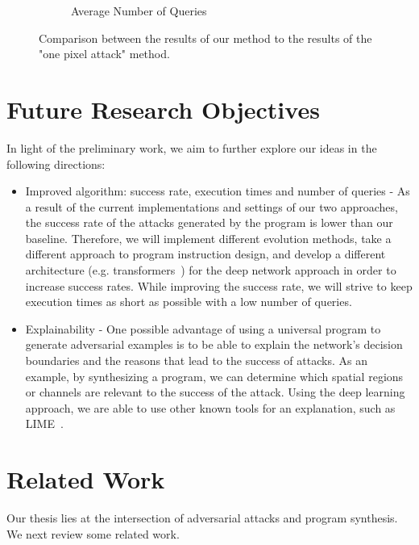 \documentclass[11pt]{article}
\begin{document}
\begin{figure}
\begin{subfigure}[b]{0.4\textwidth}
         \caption{Average Number of Queries}
         \label{number queries}
     \end{subfigure}
        \caption{Comparison between the results of our method to the results of the "one pixel attack" method.}
        \label{fig:results}
\end{figure}

\section{Future Research Objectives}
In light of the preliminary work, we aim to further explore our ideas in the following directions:
\begin{itemize}
    \item Improved algorithm: success rate, execution times and number of queries - As a result of the current implementations and settings of our two approaches, the success rate of the attacks generated by the program is lower than our baseline. Therefore, we will implement different evolution methods, take a different approach to program instruction design, and develop a different architecture (e.g. transformers~\cite{vaswani2017attention}) for the deep network approach in order to increase success rates. While improving the success rate, we will strive to keep execution times as short as possible with a low number of queries.
    \item Explainability - One possible advantage of using a universal program to generate adversarial examples is to be able to explain the network's decision boundaries and the reasons that lead to the success of attacks. As an example, by synthesizing a program, we can determine which spatial regions or channels are relevant to the success of the attack. Using the deep learning approach, we are able to use other known tools for an explanation, such as LIME~\cite{ribeiro2016why}.
\end{itemize}

\section{Related Work}
Our thesis lies at the intersection of adversarial attacks and program synthesis. We next review some
related work.
\end{document}
